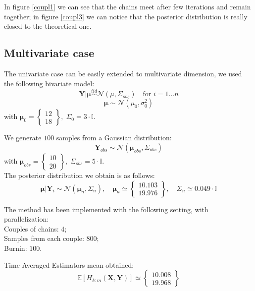 \documentclass[11pt,a4paper,oneside]{report}
\begin{document}
In figure \ref{coupl1} we can see that the chains meet after few iterations and remain together; in figure \ref{coupl3} we can notice that the posterior distribution is really closed to the theoretical one.

\newpage

\subsection{Multivariate case}

The univariate case can be easily extended to multivariate dimension, we used the following bivariate model:
$$ \boldsymbol{Y} | \boldsymbol{\mu} \overset{iid}{\sim} \mathcal{N}(\mu, \Sigma_{obs} ) \quad \text{for } i = 1 ... n $$
$$ \boldsymbol{\mu}  \sim \mathcal{N}(\mu_0, \sigma_0^2)$$
with $\boldsymbol{\mu}_0 =
\begin{Bmatrix}    %
12 \\
18
\end{Bmatrix} 
, \; \Sigma_0 = 3 \cdot \mathbb{I}$.

We generate $100$ samples from a Gaussian distribution:
$$
\boldsymbol{Y}_{obs} \sim \mathcal{N}(\boldsymbol{\mu}_{obs}, \Sigma_{obs})
$$
with
$  \boldsymbol{\mu}_{obs} =
\begin{Bmatrix}  
	10 \\
 	20
\end{Bmatrix}  
, \;  \Sigma_{obs}  = 5 \cdot \mathbb{I}
$.\\

The posterior distribution we obtain is as follows:
$$  \boldsymbol{\mu} | \boldsymbol{Y}_i \sim \mathcal{N}(\boldsymbol{\mu}_n, \Sigma_n), 
\quad \boldsymbol{\mu}_n \simeq \begin{Bmatrix}    %
10.103 \\
19.976
\end{Bmatrix} ,
\quad
\Sigma_n
\simeq 0.049 \cdot \mathbb{I} $$

The method has been implemented with the following setting, with parallelization:\\
Couples of chains: $4$;\\
Samples from each couple: $800$;\\
Burnin: $100$.



Time Averaged Estimators mean obtained:
$$ \mathbb{E}[H_{k:m}(\boldsymbol{X},\boldsymbol{Y})] \simeq \begin{Bmatrix}    %
10.008 \\
19.968
\end{Bmatrix}$$
\end{document}
